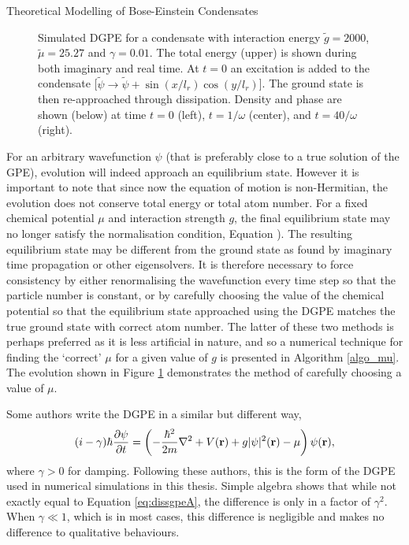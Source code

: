 \begin{chapter}{\label{cha:theoretical_model}Theoretical Modelling of Bose-Einstein Condensates}
\begin{figure}[!ht]
	\caption{Simulated DGPE for a condensate with interaction energy $\tilde{g}=2000$, $\tilde{\mu}=25.27$ and $\gamma=0.01$. The total energy (upper) is shown during both imaginary and real time. At $t = 0$ an excitation is added to the condensate [$\tilde{\psi}\rightarrow \tilde{\psi} + \sin(x/l_r)\cos(y/l_r)$]. The ground state is then re-approached through dissipation. Density and phase are shown (below) at time $t=0$ (left), $t=1/\omega$ (center), and $t=40/\omega$ (right).}\label{fig_excitationdecay}
\end{figure}

	For an arbitrary wavefunction $\psi$ (that is preferably close to a true solution of the GPE), evolution will indeed approach an equilibrium state. However it is important to note that since now the equation of motion is non-Hermitian, the evolution does not conserve total energy or total atom number. For a fixed chemical potential $\mu$ and interaction strength $g$, the final equilibrium state may no longer satisfy the normalisation condition, Equation \label{eq:normalisewf}). The resulting equilibrium state may be different from the ground state as found by imaginary time propagation or other eigensolvers. It is therefore necessary to force consistency by either renormalising the wavefunction every time step so that the particle number is constant, or by carefully choosing the value of the chemical potential so that the equilibrium state approached using the DGPE matches the true ground state with correct atom number. The latter of these two methods is perhaps preferred as it is less artificial in nature, and so a numerical technique for finding the `correct' $\mu$ for a given value of $g$ is presented in Algorithm \ref{algo_mu}. The evolution shown in Figure \ref{fig_excitationdecay} demonstrates the method of carefully choosing a value of $\mu$.

	Some authors \cite{tsubota_kasamatsu_02,madarassy_barenghi_08} write the DGPE in a similar but different way,
	\begin{equation}\label{eq:dissgpeB}
		(i-\gamma)\hbar \frac{\partial \psi}{\partial t} = \left( -\frac{\hbar^2 }{2m}\nabla^2 + V({\bf r}) + g|\psi|^2({\bf r}) - \mu \right) \psi({\bf r}),
	\end{equation}
	where $\gamma > 0$ for damping. Following these authors, this is the form of the DGPE used in numerical simulations in this thesis. Simple algebra shows that while not exactly equal to Equation \ref{eq:dissgpeA}, the difference is only in a factor of $\gamma^2$. When $\gamma \ll 1$, which is in most cases, this difference is negligible and makes no difference to qualitative behaviours.


\end{chapter}
